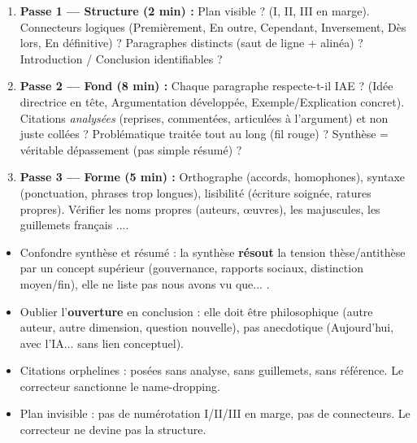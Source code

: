 \documentclass[11pt]{article}
\begin{document}
\begin{methode}
\begin{enumerate}
    \item \textbf{Passe 1 --- Structure (2 min) :} Plan visible ? (I, II, III en marge). Connecteurs logiques (Premi\`erement, En outre, Cependant, Inversement, D\`es lors, En d\'efinitive) ? Paragraphes distincts (saut de ligne + alin\'ea) ? Introduction / Conclusion identifiables ?
    \item \textbf{Passe 2 --- Fond (8 min) :} Chaque paragraphe respecte-t-il IAE ? (Id\'ee directrice en t\^ete, Argumentation d\'evelopp\'ee, Exemple/Explication concret). Citations \emph{analys\'ees} (reprises, comment\'ees, articul\'ees \`a l'argument) et non juste \guillemotleft coll\'ees \guillemotright ? Probl\'ematique trait\'ee tout au long (fil rouge) ? Synth\`ese = v\'eritable d\'epassement (pas simple r\'esum\'e) ?
    \item \textbf{Passe 3 --- Forme (5 min) :} Orthographe (accords, homophones), syntaxe (ponctuation, phrases trop longues), lisibilit\'e (\'ecriture soign\'ee, ratures propres). V\'erifier les noms propres (auteurs, \oe uvres), les majuscules, les guillemets fran\c{c}ais \guillemotleft...\guillemotright.
\end{enumerate}
\end{methode}

\begin{attention}
\begin{itemize}
    \item Confondre \guillemotleft synth\`ese \guillemotright et \guillemotleft r\'esum\'e \guillemotright : la synth\`ese \textbf{r\'esout} la tension th\`ese/antith\`ese par un concept sup\'erieur (gouvernance, rapports sociaux, distinction moyen/fin), elle ne liste pas \guillemotleft nous avons vu que... \guillemotright.
    \item Oublier l'\textbf{ouverture} en conclusion : elle doit \^etre philosophique (autre auteur, autre dimension, question nouvelle), pas anecdotique (\guillemotleft Aujourd'hui, avec l'IA... \guillemotright sans lien conceptuel).
    \item Citations \guillemotleft orphelines \guillemotright : pos\'ees sans analyse, sans guillemets, sans r\'ef\'erence. Le correcteur sanctionne le name-dropping.
    \item Plan invisible : pas de num\'erotation I/II/III en marge, pas de connecteurs. Le correcteur ne devine pas la structure.
\end{itemize}
\end{attention}
\end{document}

